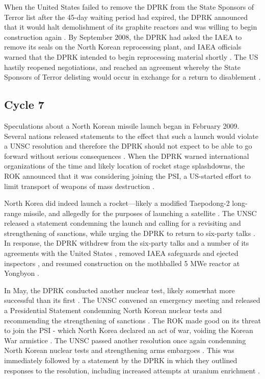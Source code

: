 When the United States failed to remove the DPRK from the State Sponsors of Terror list after the 45-day waiting period had expired, the DPRK announced that it would halt demolishment of its graphite reactors and was willing to begin construction again \cite{davenport}. By September 2008, the DPRK had asked the IAEA to remove its seals on the North Korean reprocessing plant, and IAEA officials warned that the DPRK intended to begin reprocessing material shortly \cite{iaea09}. The US hastily reopened negotiations, and reached an agreement whereby the State Sponsors of Terror delisting would occur in exchange for a return to disablement \cite{nti15}.

\subsection{Cycle 7}

Speculations about a North Korean missile launch began in February 2009. Several nations released statements to the effect that such a launch would violate a UNSC resolution and therefore the DPRK should not expect to be able to go forward without serious consequences \cite{davenport}. When the DPRK warned international organizations of the time and likely location of rocket stage splashdowns, the ROK announced that it was considering joining the PSI, a US-started effort to limit transport of weapons of mass destruction \cite{davenport}.

North Korea did indeed launch a rocket---likely a modified Taepodong-2 long-range missile, and allegedly for the purposes of launching a satellite \cite{davenport}. The UNSC released a statement condemning the launch and calling for a revisiting and strengthening of sanctions, while urging the DPRK to return to six-party talks \cite{unsc09}. In response, the DPRK withdrew from the six-party talks and a number of its agreements with the United States \cite{niksch}, removed IAEA safeguards and ejected inspectors \cite{iaea09}, and resumed construction on the mothballed 5 MWe reactor at Yongbyon \cite{nti15}.

In May, the DPRK conducted another nuclear test, likely somewhat more successful than its first \cite{nti15}. The UNSC convened an emergency meeting and released a Presidential Statement condemning North Korean nuclear tests and recommending the strengthening of sanctions \cite{unsc09p}. The ROK made good on its threat to join the PSI - which North Korea declared an act of war, voiding the Korean War armistice \cite{glionna}. The UNSC passed another resolution once again condemning North Korean nuclear tests and strengthening arms embargoes \cite{unsc09j}. This was immediately followed by a statement by the DPRK in which they outlined responses to the resolution, including increased attempts at uranium enrichment \cite{nti15}.

